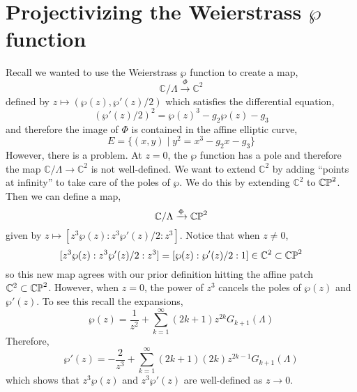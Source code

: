 \documentclass{article}
\newcommand{\C}{\mathbb{C}}
\theoremstyle{definition}
\begin{document}
\section{Projectivizing the Weierstrass $\wp$ function}

Recall we wanted to use the Weierstrass $\wp$ function to create a map,
\[ \C / \Lambda \xrightarrow{\Phi} \C^2 \]
defined by $z \mapsto (\wp(z), \wp'(z)/2)$ which satisfies the differential equation,
\[ (\wp'(z)/2)^2 = \wp(z)^3 - g_2 \wp(z) - g_3 \] 
and therefore the image of $\Phi$ is contained in the affine elliptic curve,
\[ E = \{ (x,y) \mid y^2 = x^3 - g_2 x - g_3 \} \]
However, there is a problem. At $z = 0$, the $\wp$ function has a pole and therefore the map $\C / \Lambda \to \C^2$ is not well-defined. We want to extend $\C^2$ by adding ``points at infinity'' to take care of the poles of $\wp$. We do this by extending $\C^2$ to $\mathbb{CP}^2$. Then we can define a map,
\[ \C / \Lambda \xrightarrow{\Phi} \CP^2 \]
given by $z \mapsto [ z^3 \wp(z) : z^3 \wp'(z) / 2  : z^3]$. Notice that when $z \neq 0$,
\[ [ z^3 \wp(z) : z^3 \wp'(z) / 2  : z^3] = [\wp(z) : \wp'(z) / 2 : 1 ] \in \C^2 \subset \CP^2 \]
so this new map agrees with our prior definition hitting the affine patch $\C^2 \subset \CP^2$. However, when $z = 0$, the power of $z^3$ cancels the poles of $\wp(z)$ and $\wp'(z)$. To see this recall the expansions,
\[ \wp(z) = \frac{1}{z^2} + \sum_{k = 1}^\infty (2 k + 1) z^{2k} G_{k+1}(\Lambda)  \]
Therefore,
\[ \wp'(z) = - \frac{2}{z^3} + \sum_{k = 1}^\infty (2 k + 1)(2k) z^{2k-1} G_{k+1}(\Lambda) \]
which shows that $z^3 \wp(z)$ and $z^3 \wp'(z)$ are well-defined as $z \to 0$.
\end{document}
